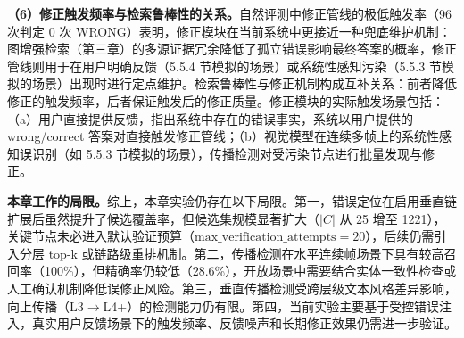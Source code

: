 \textbf{（6）修正触发频率与检索鲁棒性的关系。}自然评测中修正管线的极低触发率（96 次判定 0 次 WRONG）表明，修正模块在当前系统中更接近一种兜底维护机制：图增强检索（第三章）的多源证据冗余降低了孤立错误影响最终答案的概率，修正管线则用于在用户明确反馈（5.5.4 节模拟的场景）或系统性感知污染（5.5.3 节模拟的场景）出现时进行定点维护。检索鲁棒性与修正机制构成互补关系：前者降低修正的触发频率，后者保证触发后的修正质量。修正模块的实际触发场景包括：（a）用户直接提供反馈，指出系统中存在的错误事实，系统以用户提供的 wrong/correct 答案对直接触发修正管线；（b）视觉模型在连续多帧上的系统性感知误识别（如 5.5.3 节模拟的场景），传播检测对受污染节点进行批量发现与修正。

\medskip
\noindent\textbf{本章工作的局限。}综上，本章实验仍存在以下局限。第一，错误定位在启用垂直链扩展后虽然提升了候选覆盖率，但候选集规模显著扩大（$|C|$ 从 25 增至 1221），关键节点未必进入默认验证预算（$\mathrm{max\_verification\_attempts}=20$），后续仍需引入分层 top-k 或链路级重排机制。第二，传播检测在水平连续帧场景下具有较高召回率（100\%），但精确率仍较低（28.6\%），开放场景中需要结合实体一致性检查或人工确认机制降低误修正风险。第三，垂直传播检测受跨层级文本风格差异影响，向上传播（L3$\rightarrow$L4+）的检测能力仍有限。第四，当前实验主要基于受控错误注入，真实用户反馈场景下的触发频率、反馈噪声和长期修正效果仍需进一步验证。
